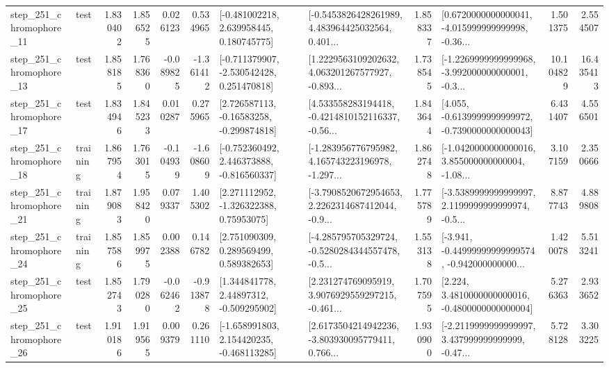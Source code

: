 \begin{tabular}{llrrrrllrlrr}
  step\_251\_chromophore\_11 &      test &      1.830402 &    1.856525 &      0.026123 &  0.534965 &    [-0.481002218, 2.639958445, 0.180745775] &  [-0.5453826428261989, 4.483964425032564, 0.401... &       1.858337 &  [0.6720000000000041, -4.015999999999998, -0.36... &            1.501375 &          2.554507 \\
  step\_251\_chromophore\_13 &      test &      1.858185 &    1.768360 &     -0.089825 & -1.361412 &   [-0.711379907, -2.530542428, 0.251470818] &  [1.2229563109202632, 4.063201267577927, -0.893... &       1.738545 &  [-1.2269999999999968, -3.992000000000001, -0.3... &           10.104829 &         16.435413 \\
  step\_251\_chromophore\_17 &      test &      1.834946 &    1.845233 &      0.010287 &  0.275965 &    [2.726587113, -0.16583258, -0.299874818] &  [4.533558283194418, -0.4214810152116337, -0.56... &       1.843644 &  [4.055, -0.6139999999999972, -0.7390000000000043] &            6.431407 &          4.556501 \\
  step\_251\_chromophore\_18 &  training &      1.867954 &    1.763015 &     -0.104939 & -1.608609 &   [-0.752360492, 2.446373888, -0.816560337] &  [-1.283956776795982, 4.165743223196978, -1.297... &       1.862748 &  [-1.0420000000000016, 3.855000000000004, -1.08... &            3.107159 &          2.350666 \\
  step\_251\_chromophore\_21 &  training &      1.879083 &    1.958420 &      0.079337 &  1.405302 &     [2.271112952, -1.326322388, 0.75953075] &  [-3.7908520672954653, 2.2262314687412044, -0.9... &       1.775789 &  [-3.5389999999999997, 2.1199999999999974, -0.5... &            8.877743 &          4.889808 \\
  step\_251\_chromophore\_24 &  training &      1.857586 &    1.859975 &      0.002388 &  0.146782 &     [2.751090309, 0.289569499, 0.589382653] &  [-4.285795705329724, -0.5280284344557478, -0.5... &       1.553138 &  [-3.941, -0.44999999999999574, -0.942000000000... &            1.420078 &          5.513241 \\
  step\_251\_chromophore\_25 &      test &      1.852743 &    1.790280 &     -0.062462 & -0.913878 &     [1.344841778, 2.44897312, -0.509295902] &  [2.231274769095919, 3.9076929559297215, -0.461... &       1.707595 &   [2.224, 3.4810000000000016, -0.4800000000000004] &            5.276363 &          2.933652 \\
  step\_251\_chromophore\_26 &      test &      1.910186 &    1.919565 &      0.009379 &  0.261110 &   [-1.658991803, 2.154420235, -0.468113285] &  [2.6173504214942236, -3.803930095779411, 0.766... &       1.930900 &  [-2.2119999999999997, 3.437999999999999, -0.47... &            5.728128 &          3.303225 \\

\end{tabular}
